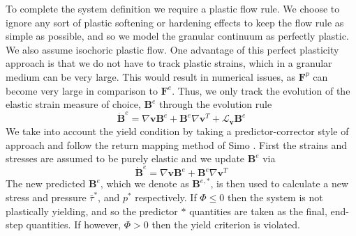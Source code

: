 To complete the system definition we require a plastic flow rule. We choose to ignore any sort of plastic softening or hardening effects to keep the flow rule as simple as possible, and so we model the granular continuum as perfectly plastic. We also assume isochoric plastic flow. One advantage of this perfect plasticity approach is that we do not have to track plastic strains, which in a granular medium can be very large. This would result in numerical issues, as $\bm{F}^p$ can become very large in comparison to $\bm{F}^e$. Thus, we only track the evolution of the elastic strain measure of choice, $\bm{B}^e$ through the evolution rule
\begin{equation}
\dot{\bm{B}}^e = \nabla \bm{v} \bm{B}^e + \bm{B}^e \nabla \bm{v}^T + \mathcal{L}_{\bm{v}} \bm{B}^e
\end{equation}
We take into account the yield condition by taking a predictor-corrector style of approach and follow the return mapping method of Simo \cite{Simo:1998}. First the strains and stresses are assumed to be purely elastic and we update $\bm{B}^e$ via
\begin{equation}
\dot{\bm{B}}^e = \nabla \bm{v} \bm{B}^e + \bm{B}^e \nabla \bm{v}^T
\end{equation}
The new predicted $\bm{B}^e$, which we denote as $\bm{B}^{e,*}$, is then used to calculate a new stress and pressure $\bar{\tau}^*$, and $p^*$ respectively. If $\Phi \leq 0$ then the system is not plastically yielding, and so the predictor $*$ quantities are taken as the final, end-step quantities. If however, $\Phi > 0$ then the yield criterion is violated.


